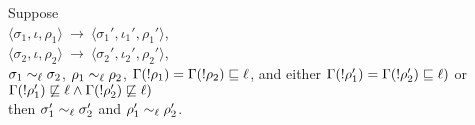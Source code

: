 \begin{myLemma}
\label{app:exc:lem:sl1}
Suppose \\
$\langle \sigma_1, \iota, \rho_1 \rangle~\rightarrow~\langle 
\sigma_1', \iota_1',\rho_1' \rangle$, \\
$\langle \sigma_2, \iota, \rho_2 \rangle~\rightarrow~\langle  
\sigma_2', \iota_2',\rho_2' \rangle$, \\
$\sigma_1 \sim_\ell \sigma_2$, 
$\rho_1 \sim_\ell \rho_2$, 
$\Gamma(!\rho_1) = \Gamma(!\rho_2) \sqsubseteq \ell$, and
either $\Gamma(!\rho_1') = \Gamma(!\rho_2') \sqsubseteq \ell)$ or
$\Gamma(!\rho_1') \not\sqsubseteq \ell \wedge \Gamma(!\rho_2')
\not\sqsubseteq \ell)$ \\ 
then $\sigma_1' \sim_\ell \sigma_2'$ and $\rho_1' \sim_\ell \rho_2'$.
\end{myLemma}
